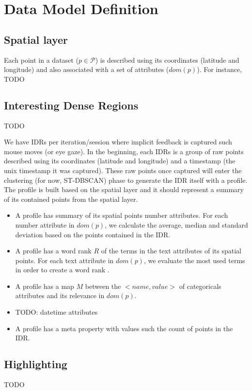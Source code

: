 \chapter{Data Model Definition}
\label{chap:model}

\section{Spatial layer}

Each point in a dataset ($p \in \mathcal{P}$) is described using its coordinates (latitude and longitude) and also associated with a set of attributes ($dom(p)$). For instance, TODO

\section{Interesting Dense Regions}

TODO

We have IDRs per iteration/session where implicit feedback is captured such mouse moves (or eye gaze). In the beginning, each IDRs is a group of raw points described using its coordinates (latitude and longitude) and a timestamp (the unix timestamp it was captured). These raw points once captured will enter the clustering (for now, ST-DBSCAN) phase to generate the IDR itself with a profile. The profile is built based on the spatial layer and it should represent a summary of its contained points from the spatial layer.

\begin{itemize}
	\item A profile has summary of its spatial points number attributes. For each number attribute in $dom(p)$, we calculate the average, median and standard deviation based on the points contained in the IDR.

	\item A profile has a word rank $R$ of the terms in the text attributes of its spatial points. For each text attribute in $dom(p)$, we evaluate the most used terms in order to create a word rank \cite{kumar2017}.

	\item A profile has a map $M$ between the $<name, value>$ of categoricals attributes and its relevance in $dom(p)$.

	\item TODO: datetime attributes

	\item A profile has a meta property with values such the count of points in the IDR.
\end{itemize}

\section{Highlighting}

TODO